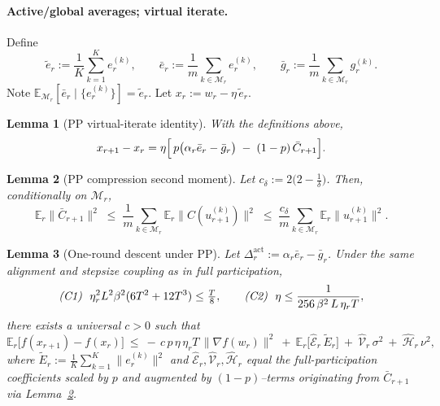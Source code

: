 \documentclass{article} %
\newcommand{\E}{\mathbb{E}}
\newtheorem{lemma}{Lemma}
\begin{document}
\paragraph{Active/global averages; virtual iterate.}
Define
\[
\tilde e_r:=\frac{1}{K}\sum_{k=1}^{K}e_r^{(k)},\qquad
\bar e_r:=\frac{1}{m}\sum_{k\in\mathcal M_r}e_r^{(k)},\qquad
\bar g_r:=\frac{1}{m}\sum_{k\in\mathcal M_r}g_r^{(k)}.
\]
Note $\E_{\mathcal M_r}[\bar e_r\mid\{e_r^{(k)}\}]=\tilde e_r$. Let $x_r:=w_r-\eta\,\tilde e_r$.

\begin{lemma}[PP virtual-iterate identity]\label{lem:pp-virt}
With the definitions above,
\begin{equation}\label{eq:PP-virt}
x_{r+1}-x_r
=\eta\Bigl[\,p\bigl(\alpha_r\bar e_r-\bar g_r\bigr)\;-\;(1-p)\,\bar C_{r+1}\Bigr].
\end{equation}
\end{lemma}

\begin{lemma}[PP compression second moment]\label{lem:pp-Cbar}
Let $c_\delta:=2\bigl(2-\tfrac1\delta\bigr)$. Then, conditionally on $\mathcal M_r$,
\[
\E_r\|\bar C_{r+1}\|^{2}\;\le\;\frac{1}{m}\sum_{k\in\mathcal M_r}\E_r\|C(u_{r+1}^{(k)})\|^{2}
\;\le\;\frac{c_\delta}{m}\sum_{k\in\mathcal M_r}\E_r\|u_{r+1}^{(k)}\|^{2}.
\]
\end{lemma}

\begin{lemma}[One-round descent under PP]\label{lem:pp-descent}
Let $\Delta_r^{\mathrm{act}}:=\alpha_r\bar e_r-\bar g_r$. Under the same alignment and
stepsize coupling as in full participation,
\[
\text{\emph{(C1)}}\ \ \eta_r^{2}L^{2}\beta^{2}(6T^{2}+12T^{3})\le \tfrac{T}{8},
\qquad
\text{\emph{(C2)}}\ \ \eta\le \frac{1}{256\,\beta^{2}\,L\,\eta_rT},
\]
there exists a universal $c>0$ such that
\begin{equation}\label{eq:pp-per-round}
\E_r\bigl[f(x_{r+1})-f(x_r)\bigr]
\ \le\
-\,c\,p\,\eta\,\eta_rT\,\|\nabla f(w_r)\|^{2}
\ +\ \E_r\bigl[\widehat{\mathcal E}_r\,\tilde E_r\bigr]
\ +\ \widehat{\mathcal V}_r\,\sigma^{2}
\ +\ \widehat{\mathcal H}_r\,\nu^{2},
\end{equation}
where $\tilde E_r:=\frac{1}{K}\sum_{k=1}^{K}\|e_r^{(k)}\|^{2}$ and
$\widehat{\mathcal E}_r,\widehat{\mathcal V}_r,\widehat{\mathcal H}_r$
equal the full-participation coefficients scaled by $p$ and augmented by
$(1-p)$–terms originating from $\bar C_{r+1}$ via Lemma~\ref{lem:pp-Cbar}.
\end{lemma}
\end{document}
